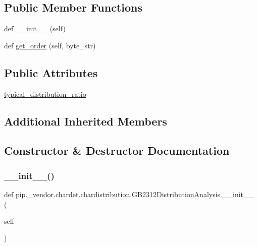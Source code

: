\subsection*{Public Member Functions}
\begin{DoxyCompactItemize}
\item 
def \hyperlink{classpip_1_1__vendor_1_1chardet_1_1chardistribution_1_1GB2312DistributionAnalysis_a0fe29a54b4af786025a211c25291acf0}{\+\_\+\+\_\+init\+\_\+\+\_\+} (self)
\item 
def \hyperlink{classpip_1_1__vendor_1_1chardet_1_1chardistribution_1_1GB2312DistributionAnalysis_a6381266b315cef153cdd222b0c6fcd84}{get\+\_\+order} (self, byte\+\_\+str)
\end{DoxyCompactItemize}
\subsection*{Public Attributes}
\begin{DoxyCompactItemize}
\item 
\hyperlink{classpip_1_1__vendor_1_1chardet_1_1chardistribution_1_1GB2312DistributionAnalysis_ae62bdda898372e822bf395f2e3ed53c6}{typical\+\_\+distribution\+\_\+ratio}
\end{DoxyCompactItemize}
\subsection*{Additional Inherited Members}


\subsection{Constructor \& Destructor Documentation}
\mbox{\label{classpip_1_1__vendor_1_1chardet_1_1chardistribution_1_1GB2312DistributionAnalysis_a0fe29a54b4af786025a211c25291acf0}} 
\subsubsection{\texorpdfstring{\+\_\+\+\_\+init\+\_\+\+\_\+()}{\_\_init\_\_()}}
{\footnotesize\ttfamily def pip.\+\_\+vendor.\+chardet.\+chardistribution.\+G\+B2312\+Distribution\+Analysis.\+\_\+\+\_\+init\+\_\+\+\_\+ (\begin{DoxyParamCaption}\item[{}]{self }\end{DoxyParamCaption})}



